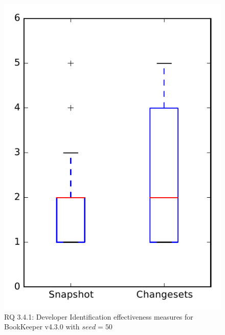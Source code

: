
\begin{figure}
\centering
\includegraphics[height=0.4\textheight]{figures/dit_seed/rq1_bookkeeper_50}
\caption{RQ 3.4.1: Developer Identification effectiveness measures for BookKeeper v4.3.0 with $seed=50$}
\label{fig:dit_seed:rq1:bookkeeper}
\end{figure}
